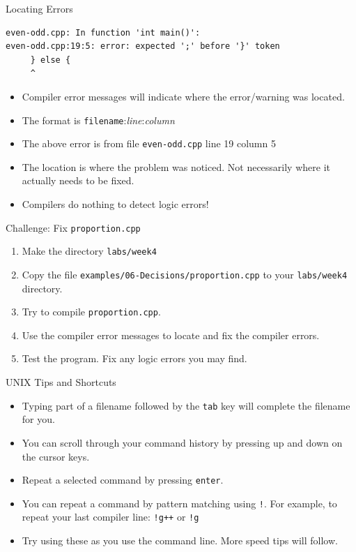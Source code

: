 \documentclass[]{beamer}
\begin{document}
\begin{frame}[fragile]{Locating Errors}
  \begin{BVerbatim}
even-odd.cpp: In function 'int main()':
even-odd.cpp:19:5: error: expected ';' before '}' token
     } else {
     ^
  \end{BVerbatim}
  \begin{itemize}[<+->]
    \item Compiler error messages will indicate where the error/warning was located.
    \item The format is \texttt{filename}:\textit{line}:\textit{column}
    \item The above error is from file \texttt{even-odd.cpp} line 19 column 5
    \item The location is where the problem was noticed.  Not necessarily where
      it actually needs to be fixed.
    \item Compilers do nothing to detect logic errors!
  \end{itemize}
\end{frame}

\begin{frame}{Challenge: Fix \texttt{proportion.cpp}}
  \begin{enumerate}[<+->]
      \item Make the directory \texttt{labs/week4}
      \item Copy the file \texttt{examples/06-Decisions/proportion.cpp} to your \texttt{labs/week4} directory.
      \item Try to compile \texttt{proportion.cpp}. 
      \item Use the compiler error messages to locate and fix the compiler errors. 
      \item Test the program.  Fix any logic errors you may find.
  \end{enumerate}
\end{frame}

\begin{frame}{UNIX Tips and Shortcuts}
    \begin{itemize}[<+->]
        \item Typing part of a filename followed by the \texttt{tab} key will complete the filename for you.
        \item You can scroll through your command history by pressing up and down on the cursor keys.
        \item Repeat a selected command by pressing \texttt{enter}.
        \item You can repeat a command by pattern matching using \texttt{!}.  For example, to repeat your last compiler line:
          \newline\texttt{!g++}
          \newline or
          \newline\texttt{!g}
        \item Try using these as you use the command line.  More speed tips will follow.
    \end{itemize}
\end{frame}
\end{document}
